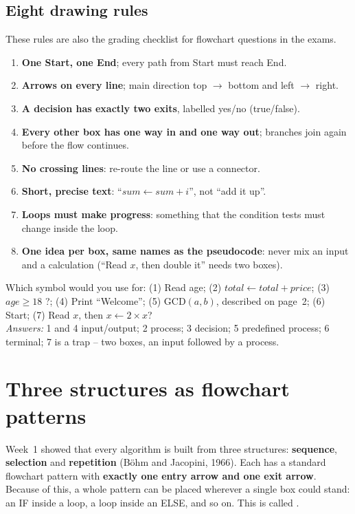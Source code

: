 \documentclass[11pt,a4paper]{article}
\begin{document}
\subsection{Eight drawing rules}\label{sec:rules}
These rules are also the grading checklist for flowchart questions in the exams.
\begin{enumerate}[leftmargin=*,itemsep=1pt]
  \item \textbf{One Start, one End}; every path from Start must reach End.
  \item \textbf{Arrows on every line}; main direction top $\to$ bottom and left $\to$ right.
  \item \textbf{A decision has exactly two exits}, labelled yes/no (true/false).
  \item \textbf{Every other box has one way in and one way out}; branches join again before the flow continues.
  \item \textbf{No crossing lines}: re-route the line or use a connector.
  \item \textbf{Short, precise text}: ``$sum \gets sum + i$'', not ``add it up''.
  \item \textbf{Loops must make progress}: something that the condition tests must change inside the loop.
  \item \textbf{One idea per box, same names as the pseudocode}: never mix an input and a calculation (``Read $x$, then double it'' needs two boxes).
\end{enumerate}

\begin{activity}
Which symbol would you use for: (1) Read age; (2) $total \gets total + price$; (3) $age \ge 18$ ?; (4) Print ``Welcome''; (5) GCD$(a,b)$, described on page~2; (6) Start; (7) Read $x$, then $x \gets 2\times x$?\\
\emph{Answers:} 1 and 4 input/output; 2 process; 3 decision; 5 predefined process; 6 terminal; 7 is a trap -- two boxes, an input followed by a process.
\end{activity}

\section{Three structures as flowchart patterns}\label{sec:structures}
Week~1 showed that every algorithm is built from three structures: \textcolor{seqc}{\textbf{sequence}}, \textcolor{selc}{\textbf{selection}} and \textcolor{repc}{\textbf{repetition}} (Böhm and Jacopini, 1966). Each has a standard flowchart pattern with \textbf{exactly one entry arrow and one exit arrow}. Because of this, a whole pattern can be placed wherever a single box could stand: an IF inside a loop, a loop inside an ELSE, and so on. This is called .
\end{document}
